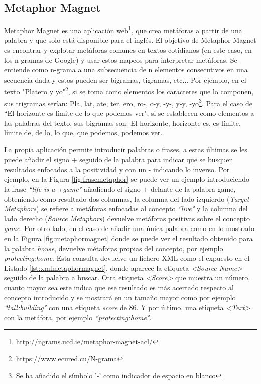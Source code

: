

\subsection{Metaphor Magnet}
\label{cap:subsec:metaphormagnet}
Metaphor Magnet es una aplicación web\footnote{http://ngrams.ucd.ie/metaphor-magnet-acl/}, que crea metáforas a partir de una palabra y que solo está disponible para el inglés. El objetivo de Metaphor Magnet \citep{VealeT2012} es encontrar y explotar metáforas comunes en textos cotidianos (en este caso, en los n-gramas de Google) y usar estos mapeos para interpretar metáforas.
Se entiende como n-grama \citep{ngrama1999} a una subsecuencia de n elementos consecutivos en una secuencia dada y estos pueden ser bigramas, tigramas, etc... Por ejemplo, en el texto "Platero y yo"\footnote{https://www.ecured.cu/N-grama}, si se toma como elementos los caracteres que lo componen, sus trigramas serían: Pla, lat, ate, ter, ero, ro-, o-y, -y-, y-y, -yo\footnote{Se ha añadido el símbolo '-'  como indicador de espacio en blanco}.
Para el caso de  ``El horizonte es límite de lo que podemos ver", si se establecen como elementos a las palabras del texto, sus bigramas son: El horizonte, horizonte es, es límite, límite de, de lo, lo que, que podemos, podemos ver.

La propia aplicación permite introducir palabras o frases, a estas últimas se les puede añadir el signo + seguido de la palabra para indicar que se busquen resultados enfocados a la positividad y con un - indicando lo inverso. Por ejemplo, en la Figura \ref{fig:frasemetaphor} se puede ver un ejemplo introduciendo la frase \textit{``life is a +game"} añadiendo el signo + delante de la palabra game, obteniendo como resultado dos columnas, la columna del lado izquierdo (\textit{Target Metaphors}) se refiere a metáforas enfocadas al concepto \textit{``live"} y la columna del lado derecho (\textit{Source Metaphors}) devuelve metáforas positivas sobre el concepto \textit{game}. Por otro lado, en el caso de añadir una única palabra como en lo mostrado en la Figura \ref{fig:metaphormagnet} donde se puede ver el resultado obtenido para la palabra \textit{house}, devuelve métaforas propias del concepto, por ejemplo \textit{protecting:home}.
Esta consulta devuelve un fichero XML como el expuesto en el Listado \ref{lst:xmlmetaphormagnet}, donde aparece la etiqueta \textit{<Source Name>} seguido de la palabra a buscar. Otra etiqueta \textit{<Score>} que muestra un número, cuanto mayor sea este indica que ese resultado es más acertado respecto al concepto introducido y se mostrará en un tamaño mayor como por ejemplo \textit{``tall:building"} con una etiqueta \textit{score} de 86. Y por último, una etiqueta \textit{<Text>} con la metáfora, por ejemplo \textit{``protecting:home"}.


